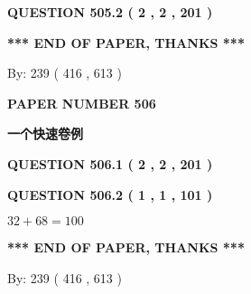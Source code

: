 \documentclass{ctexart}
\begin{document}
{\textbf{\Large{QUESTION
505.2 
 ( 2 , 2 , 201 )
}}}
  
  
   
   
 \vspace{0.2in}
 
   
   
   
   
\vspace{1.0in} 
{\textbf{\large{ *** END OF PAPER, THANKS *** }}} 
   
   
\hspace{1.0in} By: 
 239 ( 416 ,  613 )
   
   
   
   
\newpage 
\setcounter{page}{ 
   506001 } 
   
   
   
   
 {\textbf{ \Large{ PAPER NUMBER  506  }}}
   
   
\vspace{0.2in}
   
   
   
   
   
   
 \vspace{0.2in}
{\LARGE {\textbf{ 一个快速卷例}}}
   
   
  
\vspace{0.2in}
  
{\textbf{\Large{QUESTION
506.1 
 ( 2 , 2 , 201 )
}}}
  
  
  
\vspace{0.2in}
  
{\textbf{\Large{QUESTION
506.2 
 ( 1 , 1 , 101 )
}}}
  
  
 
 

$ %
32 +  %
68=   %
100$
 
 
   
   
 \vspace{0.2in}
 
   
   
   
   
\vspace{1.0in} 
{\textbf{\large{ *** END OF PAPER, THANKS *** }}} 
   
   
\hspace{1.0in} By: 
 239 ( 416 ,  613 )
   
   
   
   
\newpage 
\setcounter{page}{ 
   507001 } 
   
\end{document}
